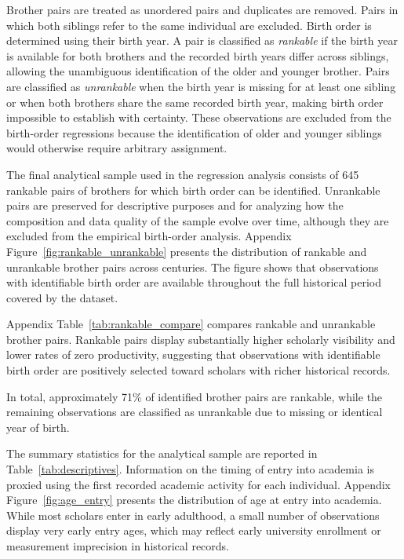 Brother pairs are treated as unordered pairs and duplicates are removed. Pairs in which both siblings refer to the same individual are excluded. Birth order is determined using their birth year. A pair is classified as \emph{rankable} if the birth year is available for both brothers and the recorded birth years differ across siblings, allowing the unambiguous identification of the older and younger brother. Pairs are classified as \emph{unrankable} when the birth year is missing for at least one sibling or when both brothers share the same recorded birth year, making birth order impossible to establish with certainty. These observations are excluded from the birth-order regressions because the identification of older and younger siblings would otherwise require arbitrary assignment.

The final analytical sample used in the regression analysis consists of 645 rankable pairs of brothers for which birth order can be identified. Unrankable pairs are preserved for descriptive purposes and for analyzing how the composition and data quality of the sample evolve over time, although they are excluded from the empirical birth-order analysis. Appendix Figure~\ref{fig:rankable_unrankable} presents the distribution of rankable and unrankable brother pairs across centuries. The figure shows that observations with identifiable birth order are available throughout the full historical period covered by the dataset.

Appendix Table~\ref{tab:rankable_compare} compares rankable and unrankable brother pairs. Rankable pairs display substantially higher scholarly visibility and lower rates of zero productivity, suggesting that observations with identifiable birth order are positively selected toward scholars with richer historical records.

In total, approximately 71\% of identified brother pairs are rankable, while the remaining observations are classified as unrankable due to missing or identical year of birth.

The summary statistics for the analytical sample are reported in Table~\ref{tab:descriptives}. Information on the timing of entry into academia is proxied using the first recorded academic activity for each individual. Appendix Figure~\ref{fig:age_entry} presents the distribution of age at entry into academia. While most scholars enter in early adulthood, a small number of observations display very early entry ages, which may reflect early university enrollment or measurement imprecision in historical records.

